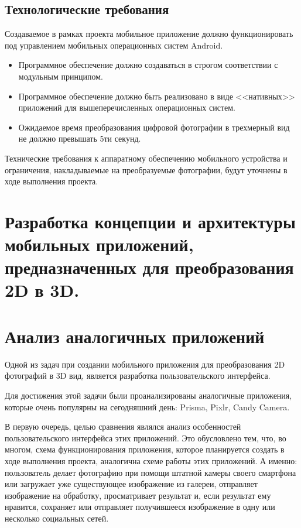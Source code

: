\subsection{Технологические требования}

Создаваемое в рамках проекта мобильное приложение должно
функционировать под управлением мобильных операционных систем Android.

\begin{itemize}
	\item Программное обеспечение должно создаваться в строгом соответствии с модульным принципом.
	\item Программное обеспечение должно быть реализовано в виде <<нативных>> приложений для вышеперечисленных операционных систем.
	\item Ожидаемое время преобразования цифровой фотографии в трехмерный вид не должно превышать 5ти секунд. 
\end{itemize}

Технические требования к аппаратному обеспечению мобильного устройства и ограничения, накладываемые на преобразуемые фотографии, будут уточнены в ходе выполнения проекта.

\section{Разработка концепции и архитектуры мобильных приложений, предназначенных для преобразования 2D в 3D.}


\section{Анализ аналогичных приложений}
Одной из задач при создании мобильного приложения для преобразования 2D фотографий в 3D вид, является разработка пользовательского интерфейса.

Для достижения этой задачи были проанализированы аналогичные приложения, которые очень популярны на сегодняшний день: Prisma, Pixlr, Candy Camera.

В первую очередь, целью сравнения являлся анализ особенностей пользовательского интерфейса этих приложений. Это обусловлено тем, что, во многом, схема функционирования приложения, которое планируется создать в ходе выполнения проекта, аналогична схеме работы этих приложений. А именно: пользователь делает фотографию при помощи штатной камеры своего смартфона или загружает уже существующее изображение из галереи, отправляет изображение на обработку, просматривает результат и, если результат ему нравится, сохраняет или отправляет получившееся изображение в одну или несколько социальных сетей.

